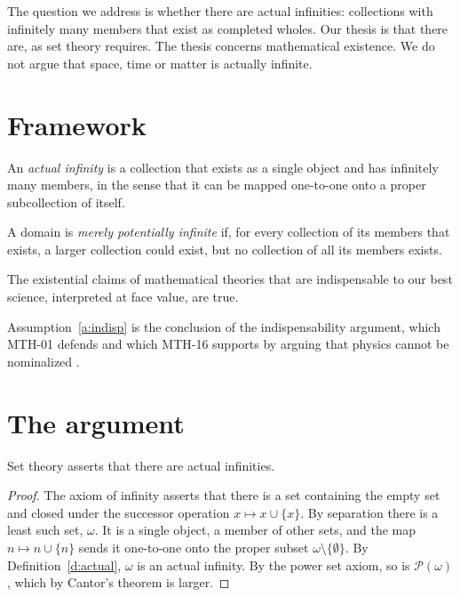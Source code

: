 \documentclass{situationist-preprint}
\begin{document}
The question we address is whether there are actual infinities: collections with infinitely many members that exist as completed wholes. Our thesis is that there are, as set theory requires. The thesis concerns mathematical existence. We do not argue that space, time or matter is actually infinite.

\section{Framework}

\begin{definition}\label{d:actual}
An \emph{actual infinity} is a collection that exists as a single object and has infinitely many members, in the sense that it can be mapped one-to-one onto a proper subcollection of itself.
\end{definition}

\begin{definition}\label{d:potential}
A domain is \emph{merely potentially infinite} if, for every collection of its members that exists, a larger collection could exist, but no collection of all its members exists.
\end{definition}

\begin{assumption}\label{a:indisp}
The existential claims of mathematical theories that are indispensable to our best science, interpreted at face value, are true.
\end{assumption}

Assumption~\ref{a:indisp} is the conclusion of the indispensability argument, which MTH-01 defends and which MTH-16 supports by arguing that physics cannot be nominalized \citep{Quine1981,Putnam1971}.

\section{The argument}

\begin{proposition}\label{p:sets}
Set theory asserts that there are actual infinities.
\end{proposition}

\begin{proof}
The axiom of infinity asserts that there is a set containing the empty set and closed under the successor operation $x \mapsto x \cup \{x\}$. By separation there is a least such set, $\omega$. It is a single object, a member of other sets, and the map $n \mapsto n \cup \{n\}$ sends it one-to-one onto the proper subset $\omega \setminus \{\emptyset\}$. By Definition~\ref{d:actual}, $\omega$ is an actual infinity. By the power set axiom, so is $\mathcal{P}(\omega)$, which by Cantor's theorem is larger.
\end{proof}
\end{document}
